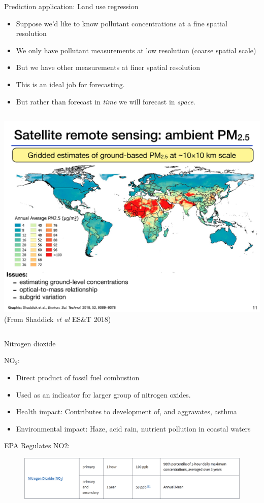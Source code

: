 \documentclass[aspectratio=169]{beamer}
\begin{document}
\begin{frame}{Prediction application: Land use regression}
  \begin{itemize}
    \item Suppose we'd like to know pollutant concentrations at a fine spatial resolution
    \item We only have pollutant measurements at low resolution (coarse spatial scale)
    \item But we have other measurements at finer spatial resolution
    \item This is an ideal job for forecasting.  
    \item But rather than forecast in \textit{time} we will forecast in \textit{space}.
  \end{itemize}

\begin{columns}
\includegraphics[width = \textwidth]{pm2_5_LUR_Shaddick.pdf}
(From Shaddick \textit{et al} ES\&T 2018)
\end{columns}
\end{frame}

\begin{frame}{Nitrogen dioxide}

NO$_2$:
\begin{itemize}
\item Direct product of fossil fuel combustion
\item Used as an indicator for larger group of nitrogen oxides.
\item Health impact: Contributes to development of, and aggravates, asthma 
\item Environmental impact: Haze, acid rain, nutrient pollution in coastal waters
\end{itemize}

EPA Regulates NO2:
\begin{figure}
\includegraphics[width=\textwidth]{EPA_NO2_reg}
\end{figure}
\end{frame}
\end{document}

